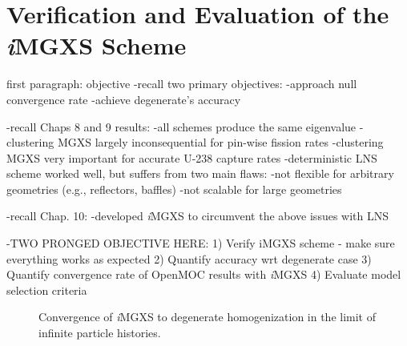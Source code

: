 \chapter{Verification and Evaluation of the \textit{i}MGXS Scheme}
\label{chap:results}

first paragraph: objective
-recall two primary objectives:
  -approach null convergence rate
  -achieve degenerate's accuracy

-recall Chaps 8 and 9 results:
  -all schemes produce the same eigenvalue
  -clustering MGXS largely inconsequential for pin-wise fission rates
  -clustering MGXS very important for accurate U-238 capture rates
  -deterministic LNS scheme worked well, but suffers from two main flaws:
    -not flexible for arbitrary geometries (e.g., reflectors, baffles)
    -not scalable for large geometries

-recall Chap. 10:
  -developed \textit{i}\ac{MGXS} to circumvent the above issues with LNS

-TWO PRONGED OBJECTIVE HERE:
  1) Verify iMGXS scheme - make sure everything works as expected
  2) Quantify accuracy wrt degenerate case
  3) Quantify convergence rate of OpenMOC results with \textit{i}\ac{MGXS} 
  4) Evaluate model selection criteria


\begin{figure}[h!]
\centering
{}
\caption[Convergence of\textit{i}MGXS to degenerate homogenization]{Convergence of \textit{i}\ac{MGXS} to degenerate homogenization in the limit of infinite particle histories.}
\label{fig:chap11-coverge-complexity}
\end{figure}

